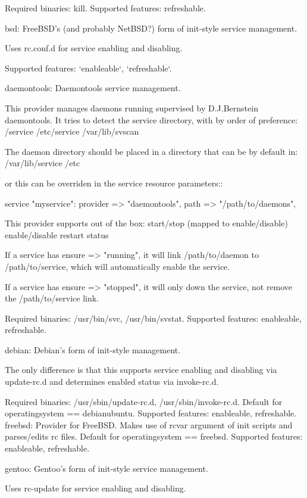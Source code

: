     Required binaries: kill. Supported features: refreshable.

    bsd: FreeBSD’s (and probably NetBSD?) form of init-style service management.

    Uses rc.conf.d for service enabling and disabling.

    Supported features: `enableable`, `refreshable`.

    daemontools: Daemontools service management.

    This provider manages daemons running supervised by D.J.Bernstein daemontools. It tries to detect the service directory, with by order of preference:
        /service
        /etc/service
        /var/lib/svscan

    The daemon directory should be placed in a directory that can be by default in:
        /var/lib/service
        /etc

    or this can be overriden in the service resource parameters::

    service { "myservice": provider => "daemontools", path => "/path/to/daemons",
    }

    This provider supports out of the box:
        start/stop (mapped to enable/disable)
        enable/disable
        restart
        status

    If a service has ensure => "running", it will link /path/to/daemon to /path/to/service, which will automatically enable the service.

    If a service has ensure => "stopped", it will only down the service, not remove the /path/to/service link.

    Required binaries: /usr/bin/svc, /usr/bin/svstat. Supported features: enableable, refreshable.

    debian: Debian’s form of init-style management.

    The only difference is that this supports service enabling and disabling via update-rc.d and determines enabled status via invoke-rc.d.

    Required binaries: /usr/sbin/update-rc.d, /usr/sbin/invoke-rc.d. Default for operatingsystem == debianubuntu. Supported features: enableable, refreshable.
    freebsd: Provider for FreeBSD. Makes use of rcvar argument of init scripts and parses/edits rc files. Default for operatingsystem == freebsd. Supported features: enableable, refreshable.

    gentoo: Gentoo’s form of init-style service management.

    Uses rc-update for service enabling and disabling.

